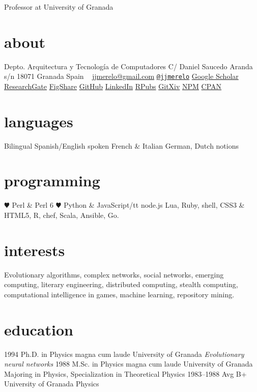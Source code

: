 \documentclass[]{friggeri-jj-cv}
\begin{document}
       {Professor at University of Granada}

\begin{aside}
  \section{about}
    Depto. Arquitectura y Tecnología de Computadores
    C/ Daniel Saucedo Aranda s/n
    18071 Granada
    Spain
    ~
    \href{mailto:jjmerelo@gmail.com}{jjmerelo@gmail.com}
    \href{http://twitter.com/jjmerelo}{{\tt @jjmerelo}}
    \href{http://scholar.google.com/citations?user=gFxqc64AAAAJ}{Google Scholar}
    \href{https://www.researchgate.net/profile/JJ_Merelo}{ResearchGate}
    \href{https://figshare.com/authors/Juan_J_Merelo/541327}{FigShare}
   \href{https://github.com/JJ}{GitHub}
   \href{http://lnkd.in/dBVqYPa}{LinkedIn}
   \href{http://rpubs.com/jjmerelo/}{RPubs}
   \href{http://gitxiv.com/users/jj-merelo}{GitXiv}
   \href{https://www.npmjs.com/~jjmerelo}{NPM}
   \href{http://search.cpan.org/~jmerelo/}{CPAN}
  \section{languages}
    Bilingual Spanish/English
    spoken French \& Italian
    German, Dutch notions
  \section{programming}
    {\color{red} \large $\varheartsuit$} Perl \& Perl 6
    {\color{red} $\varheartsuit$} Python \& JavaScript/{tt node.js}
    Lua, Ruby, shell, CSS3 \& HTML5, R, chef, Scala, Ansible, Go.
\end{aside}

\section{interests}

Evolutionary algorithms, complex networks, social networks, emerging
computing, literary engineering, distributed computing, stealth
computing, computational intelligence in games, machine learning,
repository mining.

\section{education}

\begin{entrylist}
  \entry
    {1994}
    {Ph.D. {\normalfont in Physics} magna cum laude}
    {University of Granada}
    {\emph{Evolutionary neural networks}}
  \entry
    {1988}
    {M.Sc. {\normalfont in Physics} magna cum laude}
    {University of Granada}
    {Majoring in Physics, Specialization in Theoretical Physics}
  \entry
    {1983–1988}
    {Avg B+}
    {University of Granada}
    {Physics}
\end{entrylist}
\end{document}
